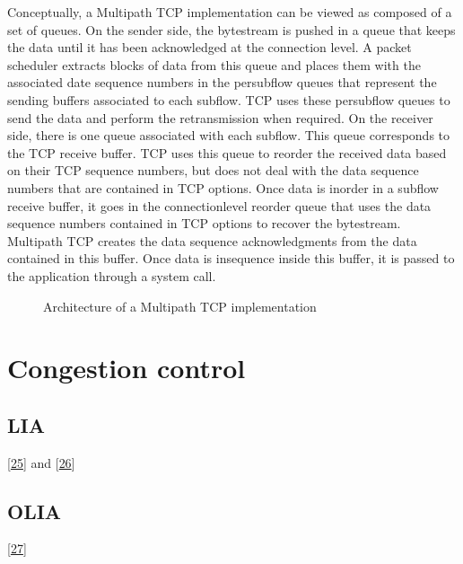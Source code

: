\documentclass[letterpaper,10pt,english]{sphinxmanual}
\begin{document}
Conceptually, a Multipath TCP implementation can be viewed as composed of a set of queues. On the sender side, the bytestream is pushed in a queue that keeps the data until it has been acknowledged at the connection level. A packet scheduler extracts blocks of data from this queue and places them with the associated date sequence numbers in the per\sphinxhyphen{}subflow queues that represent the sending buffers associated to each subflow. TCP uses these per\sphinxhyphen{}subflow queues to send the data and perform the retransmission when required. On the receiver side, there is one queue associated with each subflow. This queue corresponds to the TCP receive buffer. TCP uses this queue to reorder the received data based on their TCP sequence numbers, but does not deal with the data sequence numbers that are contained in TCP options. Once data is in\sphinxhyphen{}order in a subflow receive buffer, it goes in the connection\sphinxhyphen{}level reorder queue that uses the data sequence numbers contained in TCP options to recover the bytestream. Multipath TCP creates the data sequence acknowledgments from the data contained in this buffer. Once data is in\sphinxhyphen{}sequence inside this buffer, it is passed to the application through a  system call.
\begin{figure}[htbp]\centering\capstart{}\caption{Architecture of a Multipath TCP implementation}\label{\detokenize{mptcp:id72}}\end{figure}

\section{Congestion control}
\label{\detokenize{mptcp:congestion-control}}\label{\detokenize{mptcp:mptcp-congestion}}

\subsection{LIA}
\label{\detokenize{mptcp:lia}}
\sphinxAtStartPar
{[}\hyperlink{cite.biblio:id8932}{25}{]} and {[}\hyperlink{cite.biblio:id6203}{26}{]}


\subsection{OLIA}
\label{\detokenize{mptcp:olia}}
\sphinxAtStartPar
{[}\hyperlink{cite.biblio:id8951}{27}{]}
\end{document}
